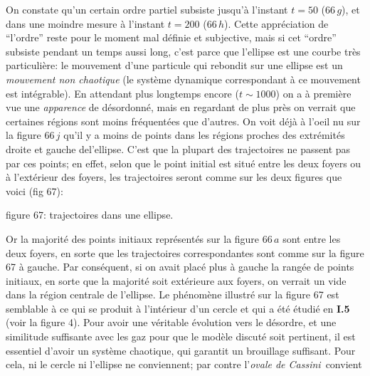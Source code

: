 On constate qu'un certain ordre partiel subsiste jusqu'\`a
l'instant $t=50$ ($66\, g$), et dans une moindre mesure \`a l'instant
$t=200$ ($66\, h$). Cette appr\'eciation de ``l'ordre'' reste pour le
moment mal d\'efinie et subjective, mais si cet ``ordre''
subsiste pendant un temps aussi long, c'est parce que l'ellipse est une
courbe tr\`es particuli\`ere: le mouvement d'une particule qui rebondit
sur une ellipse est un {\it mouvement non chaotique} (le syst\`eme
dynamique correspondant \`a ce mouvement est int\'egrable). En attendant
plus longtemps encore ($t \sim 1000$) on a \`a premi\`ere vue une
{\it apparence} de d\'esordonn\'e, mais en regardant de plus pr\`es
on verrait que certaines r\'egions sont moins fr\'equent\'ees que d'autres.
On voit d\'ej\`a \`a l'oeil nu sur la figure $66\, j$ qu'il y a moins de 
points
dans les r\'egions proches des extr\'emit\'es droite et gauche del'ellipse.
C'est que la plupart des trajectoires ne passent pas par ces points; en
effet, selon que le point initial est situ\'e entre les deux foyers
ou \`a l'ext\'erieur des
foyers, les trajectoires seront comme sur les deux figures que voici (fig 67):
\medskip
{}
\centerline{\eightrm figure 67: trajectoires dans une ellipse.}
\medskip
\midinsert
{}
\vskip4mm
\endinsert
\medskip
Or la majorit\'e des points initiaux repr\'esent\'es
sur la figure $66\, a$ sont entre les deux foyers, en sorte que les
trajectoires correspondantes sont comme sur la figure 67 \`a gauche. 
\medskip
Par cons\'equent, si on avait plac\'e plus \`a gauche la rang\'ee de points
initiaux, en sorte que la majorit\'e soit ext\'erieure aux foyers,
on verrait un vide dans la r\'egion centrale de l'ellipse.
\medskip
Le ph\'enom\`ene illustr\'e sur la figure 67 est semblable
\`a ce qui se produit \`a l'int\'erieur d'un cercle et qui a 
\'et\'e \'etudi\'e en {\bf I.5} (voir la figure 4).
\medskip
Pour avoir une v\'eritable \'evolution vers le
d\'esordre, et une similitude suffisante avec les gaz pour que le mod\`ele
discut\'e soit pertinent, il est essentiel d'avoir un syst\`eme
chaotique, qui garantit un brouillage suffisant. Pour cela, ni le cercle ni
l'ellipse ne conviennent; par contre l'{\it ovale de Cassini}\  convient
